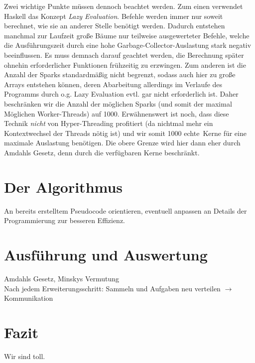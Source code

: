 \documentclass[a4paper]{scrartcl}
\newcommand{\en}[1]{\selectlanguage{USenglish}#1\selectlanguage{ngerman}}
\begin{document}
\medskip
Zwei wichtige Punkte müssen dennoch beachtet werden. Zum einen verwendet Haskell das Konzept \emph{\en{Lazy Evaluation}}. Befehle werden immer nur soweit berechnet, wie sie an anderer Stelle benötigt werden. Dadurch entstehen manchmal zur Laufzeit große Bäume nur teilweise ausgewerteter Befehle, welche die Ausführungszeit durch eine hohe Garbage-Collector-Auslastung stark negativ beeinflussen. Es muss demnach darauf geachtet werden, die Berechnung später ohnehin erforderlicher Funktionen frühzeitig zu erzwingen. Zum anderen ist die Anzahl der Sparks standardmäßig nicht begrenzt, sodass auch hier zu große Arrays entstehen können, deren Abarbeitung allerdings im Verlaufe des Programms durch o.g. Lazy Evaluation evtl. gar nicht erforderlich ist. Daher beschränken wir die Anzahl der möglichen Sparks (und somit der maximal Möglichen Worker-Threads) auf 1000. Erwähnenswert ist noch, dass diese Technik \emph{nicht} von Hyper-Threading profitiert (da nichtmal mehr ein Kontextwechsel der Threads nötig ist) und wir somit 1000 \glqq echte\grqq \ Kerne für eine maximale Auslastung benötigen. Die obere Grenze wird hier dann eher durch Amdahls Gesetz, denn durch die verfügbaren Kerne beschränkt.


\section{Der Algorithmus}

An bereits erstelltem Pseudocode orientieren, eventuell anpassen an Details der Programmierung zur besseren Effizienz.



\section{Ausführung und Auswertung}
Amdahls Gesetz, Minskys Vermutung\\
Nach jedem Erweiterungsschritt: Sammeln und Aufgaben neu verteilen $\rightarrow$ Kommunikation

\section{Fazit}
Wir sind toll.

\newpage
\printbibliography[heading=bibintoc]
\end{document}

